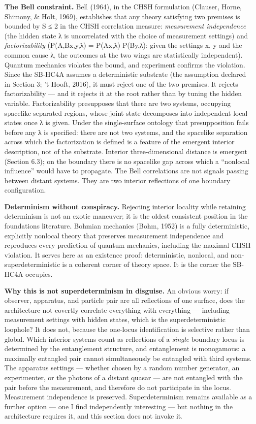 \documentclass[
]{article}
\begin{document}
\textbf{The Bell constraint.} Bell (1964), in the CHSH formulation
(Clauser, Horne, Shimony, \& Holt, 1969), establishes that any theory
satisfying two premises is bounded by S ≤ 2 in the CHSH correlation
measure: \emph{measurement independence} (the hidden state λ is
uncorrelated with the choice of measurement settings) and
\emph{factorizability} (P(A,B\textbar x,y,λ) = P(A\textbar x,λ)
P(B\textbar y,λ): given the settings x, y and the common cause λ, the
outcomes at the two wings are statistically independent). Quantum
mechanics violates the bound, and experiment confirms the violation.
Since the SB-HC4A assumes a deterministic substrate (the assumption
declared in Section 3; 't Hooft, 2016), it must reject one of the two
premises. It rejects factorizability --- and it rejects it at the root
rather than by tuning the hidden variable. Factorizability presupposes
that there are two systems, occupying spacelike-separated regions, whose
joint state decomposes into independent local states once λ is given.
Under the single-surface ontology that presupposition fails before any λ
is specified: there are not two systems, and the spacelike separation
across which the factorization is defined is a feature of the emergent
interior description, not of the substrate. Interior three-dimensional
distance is emergent (Section 6.3); on the boundary there is no
spacelike gap across which a ``nonlocal influence'' would have to
propagate. The Bell correlations are not signals passing between distant
systems. They are two interior reflections of one boundary
configuration.

\textbf{Determinism without conspiracy.} Rejecting interior locality
while retaining determinism is not an exotic maneuver; it is the oldest
consistent position in the foundations literature. Bohmian mechanics
(Bohm, 1952) is a fully deterministic, explicitly nonlocal theory that
preserves measurement independence and reproduces every prediction of
quantum mechanics, including the maximal CHSH violation. It serves here
as an existence proof: deterministic, nonlocal, and
non-superdeterministic is a coherent corner of theory space. It is the
corner the SB-HC4A occupies.

\textbf{Why this is not superdeterminism in disguise.} An obvious worry:
if observer, apparatus, and particle pair are all reflections of one
surface, does the architecture not covertly correlate everything with
everything --- including measurement settings with hidden states, which
is the superdeterministic loophole? It does not, because the one-locus
identification is selective rather than global. Which interior systems
count as reflections of a \emph{single} boundary locus is determined by
the entanglement structure, and entanglement is monogamous: a maximally
entangled pair cannot simultaneously be entangled with third systems.
The apparatus settings --- whether chosen by a random number generator,
an experimenter, or the photons of a distant quasar --- are not
entangled with the pair before the measurement, and therefore do not
participate in the locus. Measurement independence is preserved.
Superdeterminism remains available as a further option --- one I find
independently interesting --- but nothing in the architecture requires
it, and this section does not invoke it.
\end{document}

